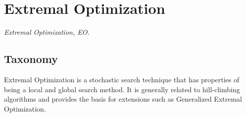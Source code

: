 

\section{Extremal Optimization} 
\label{sec:extremal_optimization}

\emph{Extremal Optimization, EO.}

\subsection{Taxonomy}
Extremal Optimization is a stochastic search technique that has properties of being a local and global search method.
It is generally related to hill-climbing algorithms and provides the basis for extensions such as Generalized Extremal Optimization.


